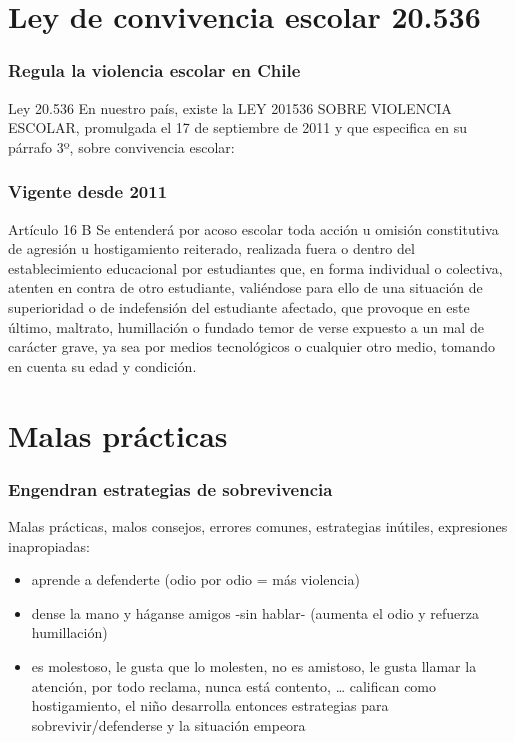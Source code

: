 \documentclass[12pt,spanish,x11names]{beamer}
\begin{document}
\section{Ley de convivencia escolar 20.536}
\begin{frame}
  \frametitle{Regula la violencia escolar en Chile}
  \begin{block}{Ley 20.536}
    En nuestro país, existe la LEY 201536 SOBRE VIOLENCIA ESCOLAR, promulgada el 17 de septiembre de 2011 y que especifica en su párrafo 3º, sobre convivencia escolar:
  \end{block}
\end{frame}
\begin{frame}
  \frametitle{Vigente desde 2011}
  \begin{block}{Artículo 16 B}
    Se entenderá por acoso escolar toda acción u omisión constitutiva de
    agresión u hostigamiento reiterado, realizada fuera o dentro del
    establecimiento educacional por estudiantes que, en forma individual o
    colectiva, atenten en contra de otro estudiante, valiéndose para ello de una
    situación de superioridad o de indefensión del estudiante afectado, que
    provoque en este último, maltrato, humillación o fundado temor de verse
    expuesto a un mal de carácter grave, ya sea por medios tecnológicos o
    cualquier otro medio, tomando en cuenta su edad y condición.
  \end{block}
\end{frame}
\section{Malas prácticas}
\begin{frame}
  \frametitle{Engendran estrategias de sobrevivencia}
  \begin{alertblock}{Malas prácticas, malos consejos, errores comunes, estrategias inútiles, expresiones inapropiadas:}
    \begin{itemize}
    \item<+-> aprende a defenderte (odio por odio = más violencia)
    \item<+-> dense la mano y háganse amigos -sin hablar- (aumenta el odio y
        refuerza humillación)
      \item<+-> es molestoso, le gusta que lo molesten, no es amistoso, le gusta
        llamar la atención, por todo reclama, nunca está contento, …​ califican
        como hostigamiento, el niño desarrolla entonces estrategias para
        sobrevivir/defenderse y la situación empeora
    \end{itemize}
  \end{alertblock}
\end{frame}
\end{document}
